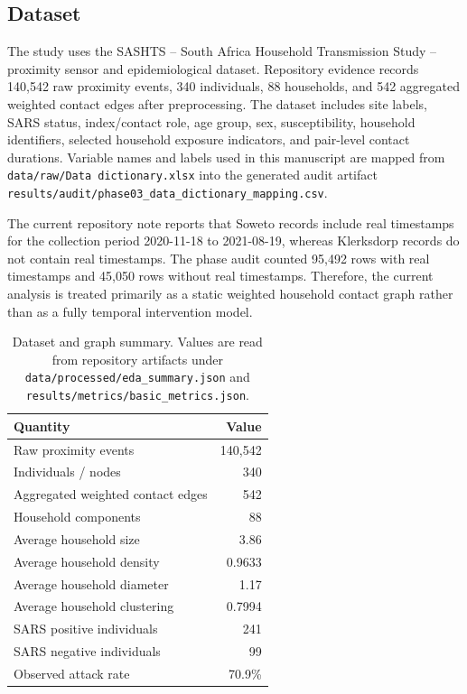 \documentclass[11pt,a4paper]{article}
\begin{document}
\subsection{Dataset}

The study uses the SASHTS -- South Africa Household Transmission Study -- proximity sensor and epidemiological dataset. Repository evidence records 140,542 raw proximity events, 340 individuals, 88 households, and 542 aggregated weighted contact edges after preprocessing. The dataset includes site labels, SARS status, index/contact role, age group, sex, susceptibility, household identifiers, selected household exposure indicators, and pair-level contact durations. Variable names and labels used in this manuscript are mapped from \texttt{data/raw/Data dictionary.xlsx} into the generated audit artifact \texttt{results/audit/phase03\_data\_dictionary\_mapping.csv}.

The current repository note reports that Soweto records include real timestamps for the collection period 2020-11-18 to 2021-08-19, whereas Klerksdorp records do not contain real timestamps. The phase audit counted 95,492 rows with real timestamps and 45,050 rows without real timestamps. Therefore, the current analysis is treated primarily as a static weighted household contact graph rather than as a fully temporal intervention model.

\begin{table}[htbp]
\centering
\caption{Dataset and graph summary. Values are read from repository artifacts under \texttt{data/processed/eda\_summary.json} and \texttt{results/metrics/basic\_metrics.json}.}
\label{tab:dataset-summary}
\begin{tabular}{lr}
\toprule
Quantity & Value \\
\midrule
Raw proximity events & 140,542 \\
Individuals / nodes & 340 \\
Aggregated weighted contact edges & 542 \\
Household components & 88 \\
Average household size & 3.86 \\
Average household density & 0.9633 \\
Average household diameter & 1.17 \\
Average household clustering & 0.7994 \\
SARS positive individuals & 241 \\
SARS negative individuals & 99 \\
Observed attack rate & 70.9\% \\
\bottomrule
\end{tabular}
\end{table}
\end{document}
